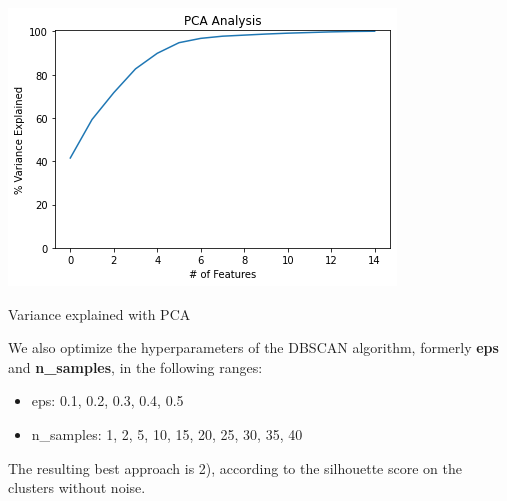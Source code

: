 \documentclass[12pt]{article}
\begin{document}
\begin{table}[ht]
\begin{minipage}[b]{0.5\linewidth}
\centering
 \includegraphics[scale=0.5]{images/knee_pca}
    \caption{Variance explained with PCA}
    \label{fig:knee_pca}
\end{minipage}
\hfill
\begin{minipage}[b]{0.5\linewidth}
\centering
{}
\caption{Best clustering obtained.}
	\label{tab:clusters_dbscan}
\end{minipage}
\end{table}

We also optimize the hyperparameters of the DBSCAN algorithm, formerly \textbf{eps} and \textbf{n\_samples}, in the following ranges:
\begin{itemize}
    \item eps: {0.1, 0.2, 0.3, 0.4, 0.5}
    \item n\_samples: {1, 2, 5, 10, 15, 20, 25, 30, 35, 40}
\end{itemize}

The resulting best approach is 2), according to the silhouette score on the clusters without noise.
\end{document}
